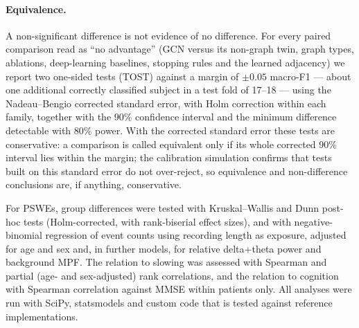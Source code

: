 \paragraph{Equivalence.} A non-significant difference is not evidence of no difference. For every paired
comparison read as ``no advantage'' (GCN versus its non-graph twin, graph types, ablations, deep-learning
baselines, stopping rules and the learned adjacency) we report two one-sided tests (TOST) against a margin of $\pm0.05$
macro-F1 --- about one additional correctly classified subject in a test fold of 17--18 --- using the
Nadeau--Bengio corrected standard error, with Holm correction within each family, together with the
90\% confidence interval and the minimum difference detectable with 80\% power. With the corrected
standard error these tests are conservative: a comparison is called equivalent only if its whole
corrected 90\% interval lies within the margin; the calibration simulation confirms that tests built on
this standard error do not over-reject, so equivalence and non-difference conclusions are, if anything,
conservative.

For PSWEs, group differences were tested with Kruskal--Wallis and Dunn post-hoc tests (Holm-corrected,
with rank-biserial effect sizes), and with negative-binomial regression of event counts using
recording length as exposure, adjusted for age and sex and, in further models, for relative
delta+theta power and background MPF. The relation to slowing was assessed with Spearman and
partial (age- and sex-adjusted) rank correlations, and the relation to cognition with Spearman
correlation against MMSE within patients only. All analyses were run with SciPy, statsmodels and
custom code that is tested against reference implementations.

